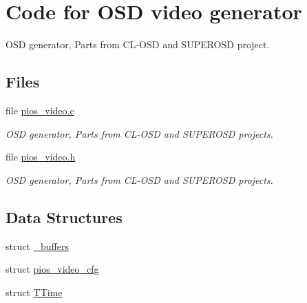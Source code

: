 \hypertarget{group___p_i_o_s___v_i_d_e_o}{\section{Code for O\-S\-D video generator}
\label{group___p_i_o_s___v_i_d_e_o}
}


O\-S\-D generator, Parts from C\-L-\/\-O\-S\-D and S\-U\-P\-E\-R\-O\-S\-D project.  


\subsection*{Files}
\begin{DoxyCompactItemize}
\item 
file \hyperlink{pios__video_8c}{pios\-\_\-video.\-c}
\begin{DoxyCompactList}\small\item\em O\-S\-D generator, Parts from C\-L-\/\-O\-S\-D and S\-U\-P\-E\-R\-O\-S\-D projects. \end{DoxyCompactList}\item 
file \hyperlink{pios__video_8h}{pios\-\_\-video.\-h}
\begin{DoxyCompactList}\small\item\em O\-S\-D generator, Parts from C\-L-\/\-O\-S\-D and S\-U\-P\-E\-R\-O\-S\-D projects. \end{DoxyCompactList}\end{DoxyCompactItemize}
\subsection*{Data Structures}
\begin{DoxyCompactItemize}
\item 
struct \hyperlink{struct__buffers}{\-\_\-buffers}
\item 
struct \hyperlink{structpios__video__cfg}{pios\-\_\-video\-\_\-cfg}
\item 
struct \hyperlink{struct_t_time}{T\-Time}
\end{DoxyCompactItemize}

